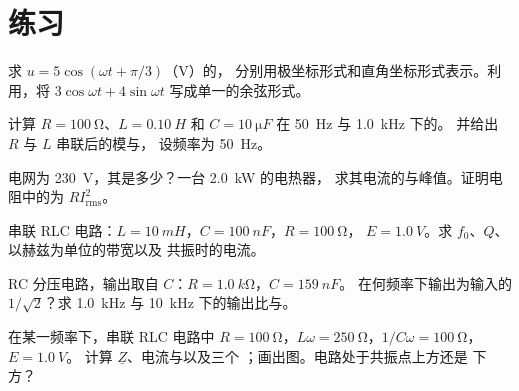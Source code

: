 \section{练习}

\begin{exercise}[$\star$]\label{exo:b1:sinusoidal-impedance:1}
求 $u = 5\cos(\omega t + \pi/3)$（V）的，
分别用极坐标形式和直角坐标形式表示。利用，将 $3\cos\omega t
+ 4\sin\omega t$ 写成单一的余弦形式。
\end{exercise}

\begin{exercise}[$\star$]\label{exo:b1:sinusoidal-impedance:2}
计算 $R = \qty{100}{\ohm}$、$L = \qty{0.10}{H}$ 和
$C = \qty{10}{\micro F}$ 在 \qty{50}{Hz} 与 \qty{1.0}{kHz} 下的。
并给出 $R$ 与 $L$ 串联后的模与，
设频率为 \qty{50}{Hz}。
\end{exercise}

\begin{exercise}[$\star$]\label{exo:b1:sinusoidal-impedance:3}
电网为 \qty{230}{V}，其是多少？一台 \qty{2.0}{kW} 的电热器，
求其电流的与峰值。证明电阻中的为
$RI_{\mathrm{rms}}^2$。
\end{exercise}

\begin{exercise}[$\star$]\label{exo:b1:sinusoidal-impedance:4}
串联 RLC 电路：$L = \qty{10}{mH}$，$C = \qty{100}{nF}$，$R = \qty{100}{\ohm}$，
$E = \qty{1.0}{V}$。求 $f_0$、$Q$、以赫兹为单位的带宽以及
共振时的电流。
\end{exercise}

\begin{exercise}[$\star\star$]\label{exo:b1:sinusoidal-impedance:5}
RC 分压电路，输出取自 $C$：$R = \qty{1.0}{k\ohm}$，$C = \qty{159}{nF}$。
在何频率下输出为输入的 $1/\sqrt2$？求
\qty{1.0}{kHz} 与 \qty{10}{kHz} 下的输出比与。
\end{exercise}

\begin{exercise}[$\star\star$]\label{exo:b1:sinusoidal-impedance:6}
在某一频率下，串联 RLC 电路中 $R = \qty{100}{\ohm}$，$L\omega =
\qty{250}{\ohm}$，$1/C\omega = \qty{100}{\ohm}$，$E = \qty{1.0}{V}$。
计算 $\underline Z$、电流与以及三个
；画出图。电路处于共振点上方还是
下方？
\end{exercise}

